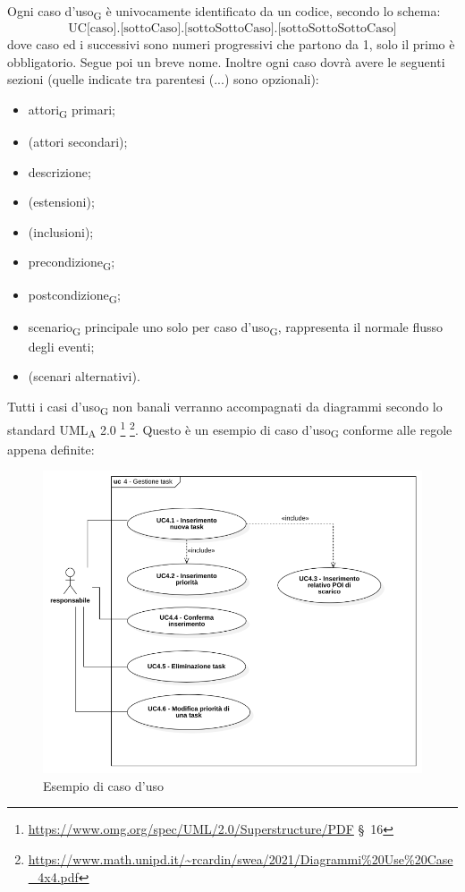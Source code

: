                 Ogni caso d'uso\textsubscript{G} è univocamente identificato da un codice, secondo lo schema:
                $$\text{UC[caso].[sottoCaso].[sottoSottoCaso].[sottoSottoSottoCaso]}$$
                dove caso ed i successivi sono numeri progressivi che partono da 1, solo il primo è obbligatorio. Segue poi un breve nome. Inoltre ogni caso dovrà avere le seguenti sezioni (quelle indicate tra parentesi (...) sono opzionali):
                \begin{itemize}
                    \item attori\textsubscript{G} primari;
                    \item (attori secondari);
                    \item descrizione;
                    \item (estensioni);
                    \item (inclusioni);
                    \item precondizione\textsubscript{G};
                    \item postcondizione\textsubscript{G};
                    \item scenario\textsubscript{G} principale uno solo per caso d'uso\textsubscript{G}, rappresenta il normale flusso degli eventi;
                    \item (scenari alternativi).
                \end{itemize}

                Tutti i casi d'uso\textsubscript{G} non banali verranno accompagnati da diagrammi secondo lo standard UML\textsubscript{A} 2.0 \footnote{\url{https://www.omg.org/spec/UML/2.0/Superstructure/PDF} \S\ 16} \footnote{\url{https://www.math.unipd.it/~rcardin/swea/2021/Diagrammi\%20Use\%20Case_4x4.pdf}}.
                Questo è un esempio di caso d'uso\textsubscript{G} conforme alle regole appena definite:
                \begin{figure}[H]
                    \centering
                    \includegraphics[scale=0.5]{res/images/esempio_use_case.png}
                    \caption{Esempio di caso d'uso}
                \end{figure}

